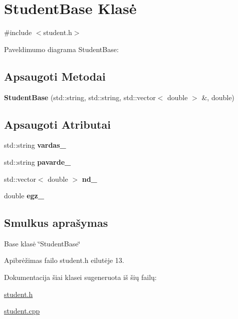 \hypertarget{classStudentBase}{}\section{Student\+Base Klasė}
\label{classStudentBase}


{\ttfamily \#include $<$student.\+h$>$}



Paveldimumo diagrama Student\+Base\+:
\subsection*{Apsaugoti Metodai}
\begin{DoxyCompactItemize}
\item 
\mbox{\label{classStudentBase_ac9be38ef1e0e6818828257756014e18b}} 
{\bfseries Student\+Base} (std\+::string, std\+::string, std\+::vector$<$ double $>$ \&, double)
\end{DoxyCompactItemize}
\subsection*{Apsaugoti Atributai}
\begin{DoxyCompactItemize}
\item 
\mbox{\label{classStudentBase_a36ecf151cf664524b26031e17dbb5c86}} 
std\+::string {\bfseries vardas\+\_\+}
\item 
\mbox{\label{classStudentBase_a0b2c4cb33772eb042ea7e684b7722f9b}} 
std\+::string {\bfseries pavarde\+\_\+}
\item 
\mbox{\label{classStudentBase_abb620131fe7d1ddc6d1be6f3d86c503a}} 
std\+::vector$<$ double $>$ {\bfseries nd\+\_\+}
\item 
\mbox{\label{classStudentBase_a6e68e3f07f833fcc7109fe7c991b4b97}} 
double {\bfseries egz\+\_\+}
\end{DoxyCompactItemize}


\subsection{Smulkus aprašymas}
Base klasė \char`\"{}\+Student\+Base\char`\"{} 

Apibrėžimas failo student.\+h eilutėje 13.



Dokumentacija šiai klasei sugeneruota iš šių failų\+:\begin{DoxyCompactItemize}
\item 
\hyperlink{student_8h}{student.\+h}\item 
\hyperlink{student_8cpp}{student.\+cpp}\end{DoxyCompactItemize}
